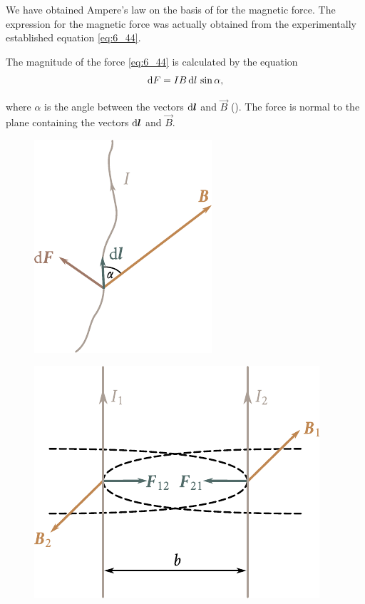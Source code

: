 We have obtained Ampere's law on the basis of  for the magnetic force. The expression for the magnetic force was actually obtained from the experimentally established equation \eqref{eq:6_44}.

The magnitude of the force \eqref{eq:6_44} is calculated by the equation
\begin{equation}\label{eq:6_45}
    \mathrm{d} F = I B\, \mathrm{d} l\, \sin\alpha,
\end{equation}

\noindent
where $\alpha$ is the angle between the vectors $\mathrm{d}\boldsymbol{l}$ and $\vec{B}$ (). The force is normal to the plane containing the vectors $\mathrm{d}\boldsymbol{l}$ and $\vec{B}$.

\begin{figure}[t]
	\begin{minipage}[t]{0.35\linewidth}
		\begin{center}
			\includegraphics[scale=1]{figures/ch_06/fig_6_9.pdf}
			\caption[]{}
			\label{fig:6_9}
		\end{center}
	\end{minipage}
	\hfill{ }%
	\begin{minipage}[t]{0.59\linewidth}
		\begin{center}
			\includegraphics[scale=1]{figures/ch_06/fig_6_10.pdf}
			\caption[]{}
			\label{fig:6_10}
		\end{center}
	\end{minipage}
\vspace{-0.4cm}
\end{figure}

